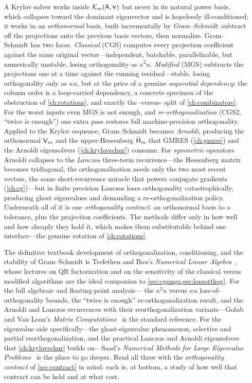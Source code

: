 \summarysection
A Krylov solver works inside $\mathcal{K}_m(\mathsf{A},\mathbf{v})$ but never in its natural
power basis, which collapses toward the dominant eigenvector and is hopelessly
ill-conditioned; it works in an \emph{orthonormal} basis, built incrementally by
\emph{Gram--Schmidt}: subtract off the projections onto the previous basis vectors,
then normalize. Gram--Schmidt has two faces. \emph{Classical} (CGS) computes every
projection coefficient against the same original vector---independent, batchable,
parallelizable, but numerically unstable, losing orthogonality as $\kappa^2 u$.
\emph{Modified} (MGS) subtracts the projections one at a time against the running
residual---stable, losing orthogonality only as $\kappa u$, but at the price of a
genuine \emph{sequential dependency}: the column order is a loop-carried dependency, a
concrete specimen of the obstruction of \cref{ch:rotations}, and exactly the
-versus- split of \cref{ch:combinators}. For the worst inputs
even MGS is not enough, and \emph{re-orthogonalization} (CGS2, ``twice is enough'') one
extra pass restores full machine-precision orthogonality. Applied to the Krylov
sequence, Gram--Schmidt becomes \emph{Arnoldi}, producing the orthonormal $\mathsf{V}_m$
and the upper-Hessenberg $\bar{\mathsf{H}}_m$ that GMRES (\cref{ch:gmres}) and the
Arnoldi eigensolvers (\cref{ch:krylovschur}) consume. For \emph{symmetric} operators
Arnoldi collapses to the \emph{Lanczos} three-term recurrence---the Hessenberg matrix
becomes tridiagonal, the orthogonalization needs only the two most recent vectors, the
same short-recurrence miracle that powers conjugate gradients (\cref{ch:cg})---but in
finite precision Lanczos loses orthogonality catastrophically, producing ghost
eigenvalues and demanding a re-orthogonalization policy. Underneath all of it is one
\emph{orthogonality contract}: an orthonormal basis to a tolerance, plus the
projection coefficients. The methods differ only in how well and how cheaply they hold
it, which makes them substitutable behind one interface---the genuine rotation of
\cref{ch:rotations}.

\furtherreading
The definitive textbook development of orthogonalization, conditioning, and the
stability of Gram--Schmidt is Trefethen and Bau's \emph{Numerical Linear
Algebra}~\citep{trefethenbau1997}, whose lectures on QR factorization and on the
sensitivity of the classical versus modified algorithms are the ideal companion to
\cref{sec:cgsmgs,sec:lossorthog}. For the full algebraic and floating-point analysis---
the $\kappa^2 u$ versus $\kappa u$ loss-of-orthogonality bounds, the ``twice is
enough'' re-orthogonalization result, and the Arnoldi and Lanczos recurrences with
their reorthogonalization variants---Golub and Van Loan's \emph{Matrix
Computations}~\citep{golubvanloan2013} is the standard reference. For the eigenvalue
side specifically---the ghost-eigenvalue phenomenon, selective and partial
reorthogonalization, and the practical Lanczos and Arnoldi eigensolvers that
\cref{ch:krylovschur} builds on---Saad's \emph{Numerical Methods for Large Eigenvalue
Problems}~\citep{saad2011eig} is the place to go deeper. Read all three with the
\emph{orthogonality contract} of \cref{sec:contract} in mind: each is, at bottom, a
study of how well that contract can be held and at what cost.

